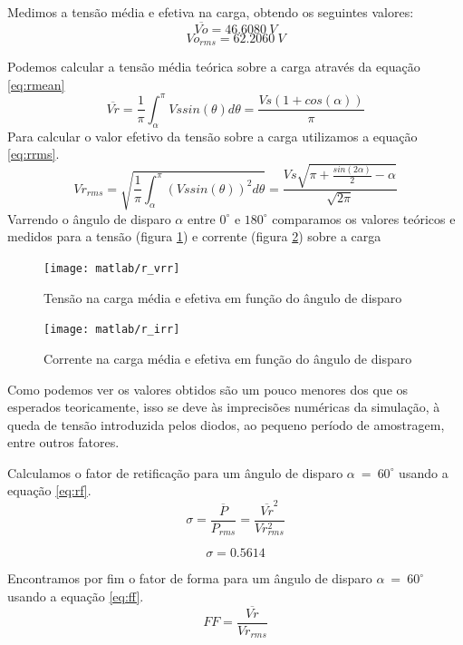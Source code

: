 \documentclass{report}
\begin{document}
Medimos a tensão média e efetiva na carga, obtendo os seguintes valores:
\begin{equation}
\overline{Vo} = 46.6080\ V
\end{equation}
\begin{equation}
Vo_{rms} =  62.2060\ V
\end{equation}

Podemos calcular a tensão média teórica sobre a carga através da equação \ref{eq:rmean}
\begin{equation}
	\overline{Vr} = \frac{1}{\pi} \int_{\alpha}^{\pi}{Vs sin(\theta)d\theta} = \frac{Vs (1 + cos(\alpha))}{\pi}
	\label{eq:rmean}
\end{equation}
Para calcular o valor efetivo da tensão sobre a carga utilizamos a equação \ref{eq:rrms}.
\begin{equation}
	Vr_{rms} = \sqrt{\frac{1}{\pi} \int_{\alpha}^{\pi}{(Vs sin(\theta))^2 d\theta}} = \frac{Vs \sqrt{\pi + \frac{sin(2\alpha)}{2}- \alpha }}{\sqrt{2 \pi}} 
	\label{eq:rrms}
\end{equation}
Varrendo o ângulo de disparo $\alpha$ entre $0^\circ$ e $180^\circ$ comparamos os valores teóricos e medidos para a tensão (figura \ref{fig:rvrr}) e corrente (figura \ref{fig:rirr}) sobre a carga
\begin{figure}[H]
	\centering
	\texttt{[image: matlab/r\_vrr]}
	\caption{Tensão na carga média e efetiva em função do ângulo de disparo}
	\label{fig:rvrr}
\end{figure}
\begin{figure}[H]
	\centering
	\texttt{[image: matlab/r\_irr]}
	\caption{Corrente na carga média e efetiva em função do ângulo de disparo}
	\label{fig:rirr}
\end{figure}
Como podemos ver os valores obtidos são um pouco menores dos que os esperados teoricamente, isso se deve às imprecisões numéricas da simulação, à queda de tensão introduzida pelos diodos, ao pequeno período de amostragem, entre outros fatores.

Calculamos o fator de retificação para um ângulo de disparo $\alpha\ =\ 60^\circ$ usando a equação \ref{eq:rf}.
\begin{equation}
	\sigma = \frac{\overline{P}}{P_{rms}} = \frac{\overline{Vr}^2}{Vr_{rms}^2}
	\label{eq:rf}
\end{equation}

\begin{equation}
	\sigma = 0.5614
\end{equation}

Encontramos por fim o fator de forma para um ângulo de disparo $\alpha\ =\ 60^\circ$ usando a equação \ref{eq:ff}.
\begin{equation}
FF = \frac{\overline{Vr}}{Vr_{rms}}
\label{eq:ff}
\end{equation}
\end{document}
